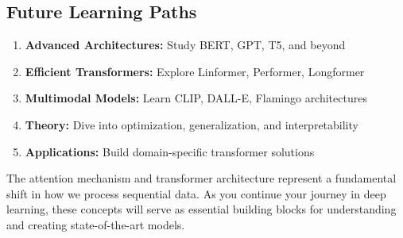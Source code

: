 \documentclass[11pt]{article}
\begin{document}
\subsection{Future Learning Paths}

\begin{enumerate}
    \item \textbf{Advanced Architectures:} Study BERT, GPT, T5, and beyond
    \item \textbf{Efficient Transformers:} Explore Linformer, Performer, Longformer
    \item \textbf{Multimodal Models:} Learn CLIP, DALL-E, Flamingo architectures
    \item \textbf{Theory:} Dive into optimization, generalization, and interpretability
    \item \textbf{Applications:} Build domain-specific transformer solutions
\end{enumerate}

The attention mechanism and transformer architecture represent a fundamental shift in how we process sequential data. As you continue your journey in deep learning, these concepts will serve as essential building blocks for understanding and creating state-of-the-art models.
\end{document}
